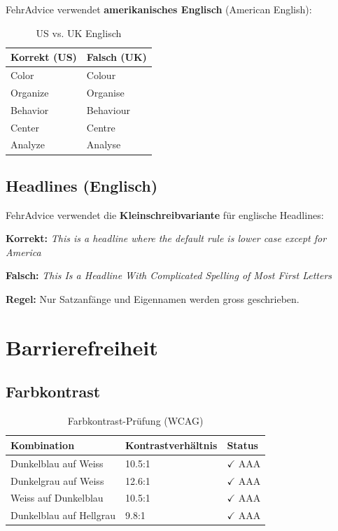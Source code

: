 FehrAdvice verwendet \textbf{amerikanisches Englisch} (American English):

\begin{table}[h]
\centering
\caption{US vs. UK Englisch}
\label{tab:us-english}
\begin{tabular}{ll}
\toprule
\textbf{Korrekt (US)} & \textbf{Falsch (UK)} \\
\midrule
Color & Colour \\
Organize & Organise \\
Behavior & Behaviour \\
Center & Centre \\
Analyze & Analyse \\
\bottomrule
\end{tabular}
\end{table}

\subsection{Headlines (Englisch)}

FehrAdvice verwendet die \textbf{Kleinschreibvariante} für englische Headlines:

\textbf{Korrekt:} \textit{This is a headline where the default rule is lower case except for America}

\textbf{Falsch:} \textit{This Is a Headline With Complicated Spelling of Most First Letters}

\textbf{Regel:} Nur Satzanfänge und Eigennamen werden gross geschrieben.


\section{Barrierefreiheit}
\label{sec:sg-accessibility}

\subsection{Farbkontrast}

\begin{table}[h]
\centering
\caption{Farbkontrast-Prüfung (WCAG)}
\label{tab:color-contrast}
\begin{tabular}{lll}
\toprule
\textbf{Kombination} & \textbf{Kontrastverhältnis} & \textbf{Status} \\
\midrule
Dunkelblau auf Weiss & 10.5:1 & $\checkmark$ AAA \\
Dunkelgrau auf Weiss & 12.6:1 & $\checkmark$ AAA \\
Weiss auf Dunkelblau & 10.5:1 & $\checkmark$ AAA \\
Dunkelblau auf Hellgrau & 9.8:1 & $\checkmark$ AAA \\
\bottomrule
\end{tabular}
\end{table}

